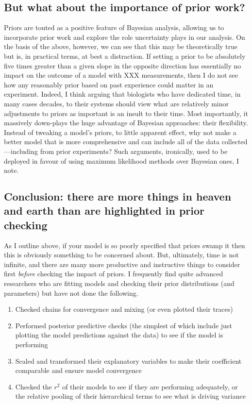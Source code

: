 \documentclass[12pt]{report}
\begin{document}
\subsection*{But what about the importance of prior work?}
Priors are touted as a positive feature of Bayesian analysis, allowing us to incorporate prior work and explore the role uncertainty plays in our analysis. On the basis of the above, however, we can see that this may be theoretically true but is, in practical terms, at best a distraction. If setting a prior to be absolutely five times greater than a given slope in the opposite direction has essentially no impact on the outcome of a model with XXX measurements, then I do not see how any reasonably prior based on past experience could matter in an experiment. Indeed, I think arguing that biologists who have dedicated time, in many cases decades, to their systems should view what are relatively minor adjustments to priors as important is an insult to their time. Most importantly, it massively down-plays the huge advantage of Bayesian approaches: their flexibility. Instead of tweaking a model's priors, to little apparent effect, why not make a better model that is more comprehensive and can include all of the data collected---including from prior experiments? Such arguments, ironically, used to be deployed in favour of using maximum likelihood methods over Bayesian ones, I note.

\subsection*{Conclusion: there are more things in heaven and earth than are highlighted in prior checking}
As I outline above, if your model is so poorly specified that priors swamp it then this is obviously something to be concerned about. But, ultimately, time is not infinite, and there are many more productive and instructive things to consider first \emph{before} checking the impact of priors. I frequently find quite advanced researchers who are fitting models and checking their prior distributions (and parameters) but have not done the following.

\begin{enumerate}
\item Checked chains for convergence and mixing (or even plotted their traces)
\item Performed posterior predictive checks (the simplest of which include just plotting the model predictions against the data) to see if the model is performing
\item Scaled and transformed their explanatory variables to make their coefficient comparable and ensure model convergence
\item Checked the $r^2$ of their models to see if they are performing adequately, or the relative pooling of their hierarchical terms to see what is driving variance
\end{enumerate}
\end{document}
